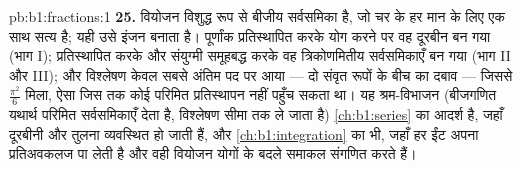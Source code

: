 \begin{solution}{pb:b1:fractions:1}
\textbf{25.} वियोजन विशुद्ध रूप से बीजीय सर्वसमिका है, जो चर के हर मान के
लिए एक साथ सत्य है; यही उसे इंजन बनाता है। पूर्णांक प्रतिस्थापित करके योग
करने पर वह दूरबीन बन गया (भाग I);  प्रतिस्थापित करके और संयुग्मी
समूहबद्ध करके वह त्रिकोणमितीय सर्वसमिकाएँ बन गया (भाग II और III); और
विश्लेषण केवल सबसे अंतिम पद पर आया --- दो संवृत रूपों के बीच का दबाव ---
जिससे $\frac{\pi^2}6$ मिला, ऐसा  जिस तक कोई परिमित प्रतिस्थापन नहीं पहुँच
सकता था। यह श्रम-विभाजन (बीजगणित यथार्थ परिमित सर्वसमिकाएँ देता है, विश्लेषण
सीमा तक ले जाता है) \cref{ch:b1:series} का आदर्श है, जहाँ दूरबीनी और तुलना
व्यवस्थित हो जाती हैं, और \cref{ch:b1:integration} का भी, जहाँ हर ईंट अपना
प्रतिअवकलज पा लेती है और वही वियोजन योगों के बदले समाकल संगणित करते हैं।
\end{solution}
